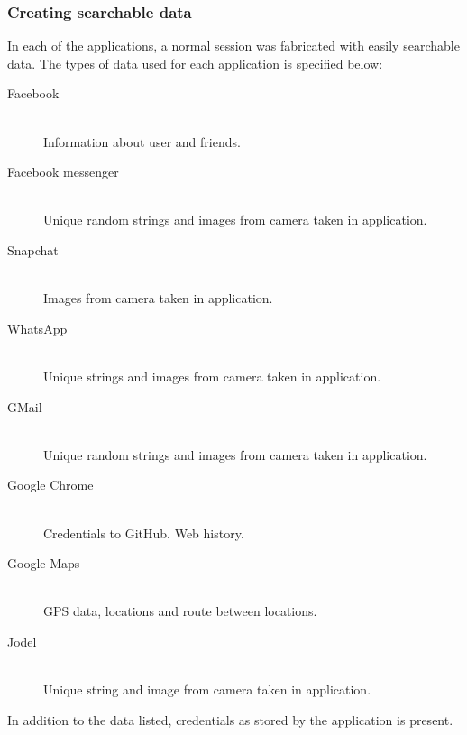 \subsubsection{Creating searchable data}
In each of the applications, a normal session was fabricated with easily searchable data.
The types of data used for each application is specified below:
\begin{description}
\item[Facebook] \hfill\\
Information about user and friends.
\item[Facebook messenger]\hfill\\
Unique random strings and images from camera taken in application.
\item[Snapchat]\hfill\\
Images from camera taken in application.
\item[WhatsApp]\hfill\\
Unique strings and images from camera taken in application.
\item[GMail]\hfill\\
Unique random strings and images from camera taken in application.
\item[Google Chrome]\hfill\\
Credentials to GitHub. Web history.
\item[Google Maps]\hfill\\
GPS data, locations and route between locations.
\item[Jodel]\hfill\\
Unique string and image from camera taken in application.
\end{description}
In addition to the data listed, credentials as stored by the application is present.

